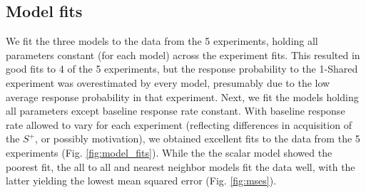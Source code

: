 \subsection{Model fits}
We fit the three models to the data from the 5 experiments, holding all parameters constant (for each model) across the experiment fits.  
This resulted in good fits to 4 of the 5 experiments, but the response probability to the 1-Shared experiment was overestimated by every model, presumably due to the low average response probability in that experiment.  
Next, we fit the models holding all parameters except baseline response rate constant.  
With baseline response rate allowed to vary for each experiment (reflecting differences in acquisition of the $S^+$, or possibly motivation), we obtained excellent fits to the data from the 5 experiments (Fig. \ref{fig:model_fits}).  
While the the scalar model showed the poorest fit, the all to all and nearest neighbor models fit the data well, with the latter yielding the lowest mean squared error (Fig. \ref{fig:mses}).  